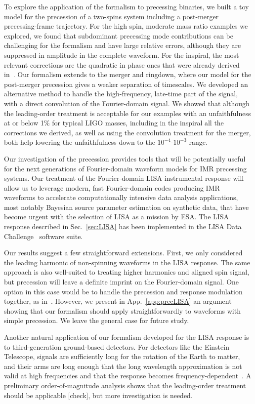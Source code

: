 \documentclass[aps,showpacs,twocolumn,
prd,superscriptaddress,nofootinbib]{revtex4-1}
\newcommand{\SM}[1]{{\color{Red} #1}}
\begin{document}
To explore the application of the formalism to precessing binaries, we built a toy model for the precession of a two-spins system including a post-merger precessing-frame trajectory. For the high spin, moderate mass ratio examples we explored, we found that subdominant precessing mode contributions can be challenging for the formalism and have large relative errors, although they are suppressed in amplitude in the complete waveform. For the inspiral, the most relevant corrections are the quadratic in phase ones that were already derived in~\cite{KCY14}. Our formalism extends to the merger and ringdown, where our model for the post-merger precession gives a weaker separation of timescales. We developed an alternative method to handle the high-frequency, late-time part of the signal, with a direct convolution of the Fourier-domain signal. We showed that although the leading-order treatment is acceptable for our examples with an unfaithfulness at or below 1\% for typical LIGO masses, including in the inspiral all the corrections we derived, as well as using the convolution treatment for the merger, both help lowering the unfaithfulness down to the $10^{-4}$-$10^{-3}$ range.

Our investigation of the precession provides tools that will be potentially useful for the next generations of Fourier-domain waveform models for IMR precessing systems. Our treatment of the Fourier-domain LISA instrumental response will allow us to leverage modern, fast Fourier-domain codes producing IMR waveforms to accelerate computationally intensive data analysis applications, most notably Bayesian source parameter estimation on synthetic data, that have become urgent with the selection of LISA as a mission by ESA. The LISA response described in Sec.~\ref{sec:LISA} has been implemented in the LISA Data Challenge~\cite{LDC} software suite.

Our results suggest a few straightforward extensions. First, we only considered the leading harmonic of non-spinning waveforms in the LISA response. The same approach is also well-suited to treating higher harmonics and aligned spin signal, but precession will leave a definite imprint on the Fourier-domain signal. One option in this case would be to handle the precession and response modulation together, as in~\cite{Klein+15}. However, we present in App.~\ref{app:precLISA} an argument showing that our formalism should apply straightforwardly to waveforms with simple precession. We leave the general case for future study.

Another natural application of our formalism developed for the LISA response is to third-generation ground-based detectors. For detectors like the Einstein Telescope, signals are sufficiently long for the rotation of the Earth to matter, and their arms are long enough that the long wavelength approximation is not valid at high frequencies and that the response becomes frequency-dependent~\cite{Essick+17}. A preliminary order-of-magnitude analysis shows that the leading-order treatment should be applicable \SM{[check]}, but more investigation is needed.
\end{document}

